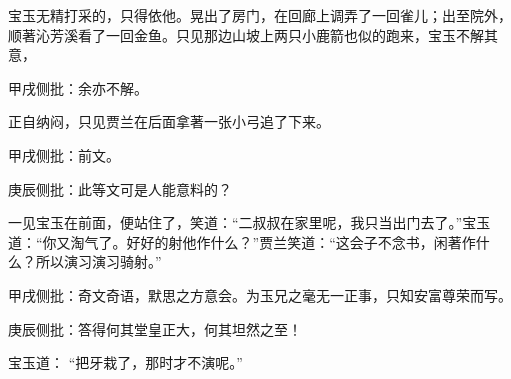 \begin{parag}


    宝玉无精打采的，只得依他。晃出了房门，在回廊上调弄了一回雀儿；出至院外，顺著沁芳溪看了一回金鱼。只见那边山坡上两只小鹿箭也似的跑来，宝玉不解其意，\begin{note}甲戌侧批：余亦不解。\end{note}正自纳闷，只见贾兰在后面拿著一张小弓追了下来。\begin{note}甲戌侧批：前文。\end{note}\begin{note}庚辰侧批：此等文可是人能意料的？\end{note}一见宝玉在前面，便站住了，笑道：“二叔叔在家里呢，我只当出门去了。”宝玉道：“你又淘气了。好好的射他作什么？”贾兰笑道：“这会子不念书，闲著作什么？所以演习演习骑射。”\begin{note}甲戌侧批：奇文奇语，默思之方意会。为玉兄之毫无一正事，只知安富尊荣而写。\end{note}\begin{note}庚辰侧批：答得何其堂皇正大，何其坦然之至！\end{note}宝玉道： “把牙栽了，那时才不演呢。”
\end{parag}


